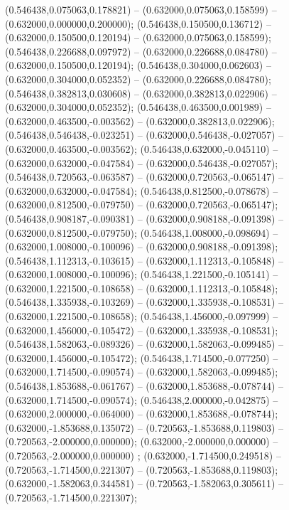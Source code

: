  (0.546438,0.075063,0.178821) -- (0.632000,0.075063,0.158599) -- (0.632000,0.000000,0.200000);
 (0.546438,0.150500,0.136712) -- (0.632000,0.150500,0.120194) -- (0.632000,0.075063,0.158599);
 (0.546438,0.226688,0.097972) -- (0.632000,0.226688,0.084780) -- (0.632000,0.150500,0.120194);
 (0.546438,0.304000,0.062603) -- (0.632000,0.304000,0.052352) -- (0.632000,0.226688,0.084780);
 (0.546438,0.382813,0.030608) -- (0.632000,0.382813,0.022906) -- (0.632000,0.304000,0.052352);
 (0.546438,0.463500,0.001989) -- (0.632000,0.463500,-0.003562) -- (0.632000,0.382813,0.022906);
 (0.546438,0.546438,-0.023251) -- (0.632000,0.546438,-0.027057) -- (0.632000,0.463500,-0.003562);
 (0.546438,0.632000,-0.045110) -- (0.632000,0.632000,-0.047584) -- (0.632000,0.546438,-0.027057);
 (0.546438,0.720563,-0.063587) -- (0.632000,0.720563,-0.065147) -- (0.632000,0.632000,-0.047584);
 (0.546438,0.812500,-0.078678) -- (0.632000,0.812500,-0.079750) -- (0.632000,0.720563,-0.065147);
 (0.546438,0.908187,-0.090381) -- (0.632000,0.908188,-0.091398) -- (0.632000,0.812500,-0.079750);
 (0.546438,1.008000,-0.098694) -- (0.632000,1.008000,-0.100096) -- (0.632000,0.908188,-0.091398);
 (0.546438,1.112313,-0.103615) -- (0.632000,1.112313,-0.105848) -- (0.632000,1.008000,-0.100096);
 (0.546438,1.221500,-0.105141) -- (0.632000,1.221500,-0.108658) -- (0.632000,1.112313,-0.105848);
 (0.546438,1.335938,-0.103269) -- (0.632000,1.335938,-0.108531) -- (0.632000,1.221500,-0.108658);
 (0.546438,1.456000,-0.097999) -- (0.632000,1.456000,-0.105472) -- (0.632000,1.335938,-0.108531);
 (0.546438,1.582063,-0.089326) -- (0.632000,1.582063,-0.099485) -- (0.632000,1.456000,-0.105472);
 (0.546438,1.714500,-0.077250) -- (0.632000,1.714500,-0.090574) -- (0.632000,1.582063,-0.099485);
 (0.546438,1.853688,-0.061767) -- (0.632000,1.853688,-0.078744) -- (0.632000,1.714500,-0.090574);
 (0.546438,2.000000,-0.042875) -- (0.632000,2.000000,-0.064000) -- (0.632000,1.853688,-0.078744);
 (0.632000,-1.853688,0.135072) -- (0.720563,-1.853688,0.119803) -- (0.720563,-2.000000,0.000000);
 (0.632000,-2.000000,0.000000) -- (0.720563,-2.000000,0.000000) ;
 (0.632000,-1.714500,0.249518) -- (0.720563,-1.714500,0.221307) -- (0.720563,-1.853688,0.119803);
 (0.632000,-1.582063,0.344581) -- (0.720563,-1.582063,0.305611) -- (0.720563,-1.714500,0.221307);
